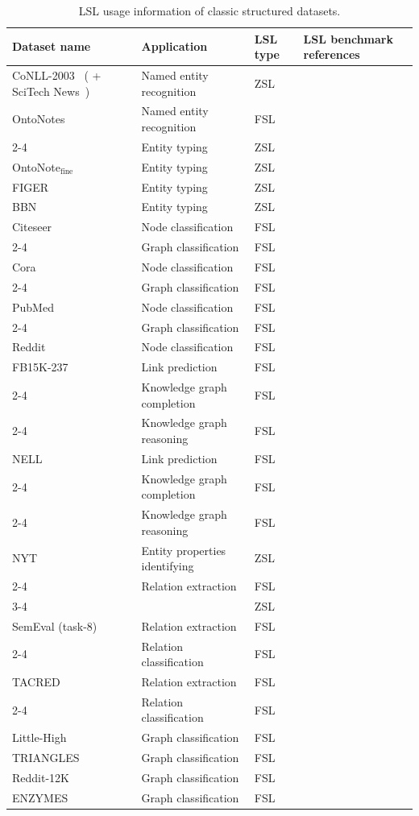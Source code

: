 \begin{table}[t]
\centering
\footnotesize
\caption{LSL usage information of classic structured datasets.}
\label{tab5-1-1}
\begin{tabular}{p{70pt}|p{100pt}|p{30pt}|p{150pt}}
\hline
Dataset name & Application & LSL type & LSL benchmark references \\
\hline
CoNLL-2003~ ( + SciTech News~) & Named entity recognition & ZSL &  \\
\hline
OntoNotes~ & Named entity recognition & FSL &  \\
\cline{2-4}
 & Entity typing & ZSL &  \\
\hline
OntoNote$_{\text{fine}}$~ & Entity typing & ZSL &  \\
\hline
FIGER~ & Entity typing & ZSL &  \\
\hline
BBN~ & Entity typing & ZSL &  \\
\hline
Citeseer~ & Node classification & FSL &  \\
\cline{2-4}
 & Graph classification & FSL &  \\
\hline
Cora~ & Node classification & FSL &  \\
\cline{2-4}
 & Graph classification & FSL &  \\
\hline
PubMed~ & Node classification & FSL &  \\
\cline{2-4}
 & Graph classification & FSL &  \\
\hline
Reddit~ & Node classification & FSL &  \\
\hline
FB15K-237~ & Link prediction & FSL &  \\
\cline{2-4}
 & Knowledge graph completion & FSL &  \\
\cline{2-4}
 & Knowledge graph reasoning & FSL &  \\
\hline
NELL~ & Link prediction & FSL &  \\
\cline{2-4}
 & Knowledge graph completion & FSL &  \\
\cline{2-4}
 & Knowledge graph reasoning & FSL &  \\
\hline
NYT~ & Entity properties identifying & ZSL &  \\
\cline{2-4}
 & Relation extraction & FSL &  \\
\cline{3-4}
 & & ZSL &  \\
\hline
SemEval (task-8)~ & Relation extraction & FSL &  \\
\cline{2-4}
 & Relation classification & FSL &  \\
\hline
TACRED~ & Relation extraction & FSL &  \\
\cline{2-4}
 & Relation classification & FSL &  \\
\hline
Little-High~ & Graph classification & FSL &  \\
\hline
TRIANGLES~ & Graph classification & FSL &  \\
\hline
Reddit-12K~ & Graph classification & FSL &  \\
\hline
ENZYMES~ & Graph classification & FSL &  \\
\hline
\end{tabular}
\end{table}

